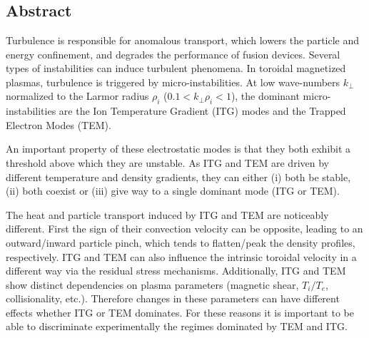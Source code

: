 \chapter*{} 

\vspace{-2cm}

\section*{Abstract}


Turbulence is responsible for anomalous transport, which lowers the particle and energy confinement, and degrades the performance of fusion devices. Several types of instabilities can induce turbulent phenomena. In toroidal magnetized plasmas, turbulence is triggered by micro-instabilities. At low wave-numbers $k_{\perp}$ normalized to the Larmor radius $\rho_i$ ($0.1<k_{\perp}\rho_i<1$), the dominant micro-instabilities are the Ion Temperature Gradient (ITG) modes and the Trapped Electron Modes (TEM). 

An important property of these electrostatic modes is that they both exhibit a threshold above which they are unstable. As ITG and TEM are driven by different temperature and density gradients, they can either (i) both be stable, (ii) both coexist or (iii) give way to a single dominant mode (ITG or TEM). 

The heat and particle transport induced by ITG and TEM are noticeably different. First the sign of their convection velocity can be opposite, leading to an outward/inward particle pinch, which tends to flatten/peak the density profiles, respectively. ITG and TEM can also influence the intrinsic toroidal velocity in a different way via the residual stress mechanisms. Additionally, ITG and TEM show distinct dependencies on plasma parameters (magnetic shear, $T_i/T_e$, collisionality, etc.). Therefore changes in these parameters can have different effects whether ITG or TEM dominates. For these reasons it is important to be able to discriminate experimentally the regimes dominated by TEM and ITG.

